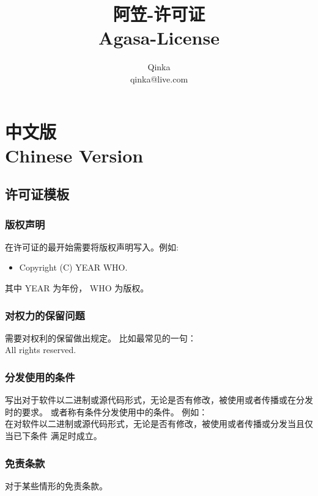 \documentclass[UTF8]{book}
\author{Qinka \\ qinka@live.com}
\title{阿笠-许可证\\Agasa-License}
\begin{document}
    \maketitle
    
    \chapter{中文版\\Chinese Version}
    \section{许可证模板}
    \subsection{版权声明}
    在许可证的最开始需要将版权声明写入。例如:
    \begin{itemize}
        \item Copyright (C) YEAR WHO.
    \end{itemize}
    其中 YEAR 为年份， WHO 为版权。
    \subsection{对权力的保留问题}
    需要对权利的保留做出规定。
    比如最常见的一句：\\
     All rights reserved.
    \subsection{分发使用的条件}
    写出对于软件以二进制或源代码形式，无论是否有修改，被使用或者传播或在分发时的要求。
    或者称有条件分发使用中的条件。
    例如：\\
    在对软件以二进制或源代码形式，无论是否有修改，被使用或者传播或分发当且仅当已下条件
    满足时成立。
    \subsection{免责条款}
    对于某些情形的免责条款。
    
\end{document}
